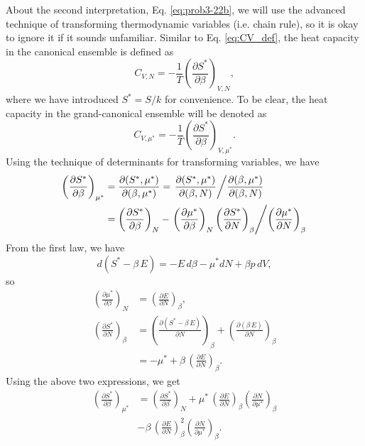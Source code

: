 \documentclass[reprint]{revtex4-1}
\numberwithin{equation}{section}
\begin{document}
About the second interpretation, Eq. \eqref{eq:prob3-22b},
we will use the advanced technique of transforming thermodynamic variables
(i.e. chain rule),
so it is okay to ignore it if it sounds unfamiliar.
%
Similar to Eq. \eqref{eq:CV_def},
the heat capacity in the canonical ensemble is defined as
\begin{equation}
C_{V, N}
= -\frac{1}{T} \left( \frac{ \partial S^* } { \partial \beta } \right)_{V, N},
  \label{eq:CVN_def}
\end{equation}
where we have introduced $S^* = S/k$ for convenience.
%
To be clear, the heat capacity in the grand-canonical ensemble
will be denoted as
\begin{equation}
C_{V, \mu^*} = -\frac{1}{T} \left( \frac{ \partial S^* } { \partial \beta } \right)_{V, \mu^*}.
  \label{eq:CVmu_def}
\end{equation}
%
Using the technique of determinants for transforming variables, we have
\begin{align*}
  \left( \frac{ \partial S^* } {\partial \beta } \right)_{\mu^*}
  &=
  \frac{ \partial (S^*, \mu^*) } { \partial (\beta, \mu^*) }
  =
  \left.
  \frac{ \partial (S^*, \mu^*) } { \partial (\beta, N) }
  \middle/
  \frac{ \partial (\beta, \mu^*) } { \partial (\beta, N) }
  \right.
  \\
  &=
  \left( \frac{ \partial S^* } {\partial \beta } \right)_{N}
  -
  \left.
  \left( \frac{ \partial \mu^* } {\partial \beta } \right)_{N}
  \left( \frac{ \partial S^* } {\partial N } \right)_{\beta}
  \middle/
  \left( \frac{ \partial \mu^* } {\partial N } \right)_{\beta}
  \right.
\end{align*}
From the first law, we have
$$
d(S^* - \beta \, E) = -E \, d\beta -\mu^* dN + \beta p \, dV
,
$$
%
so
\begin{align*}
  \left( \frac{ \partial \mu^* } {\partial \beta } \right)_{N}
  &=
  \left( \frac{ \partial E } {\partial N } \right)_{\beta}
  ,
  \\
  \left( \frac{ \partial S^* } {\partial N } \right)_{\beta}
  &=
  \left( \frac{ \partial (S^* - \beta \, E) } {\partial N } \right)_{\beta}
  +
  \left( \frac{ \partial ( \beta \,  E) } {\partial N } \right)_{\beta}
  \\
  &=
  -\mu^*
  +
  \beta \, \left( \frac{ \partial E } {\partial N } \right)_{\beta}
  .
\end{align*}
Using the above two expressions, we get
\begin{align*}
  \left( \frac{ \partial S^* } {\partial \beta } \right)_{\mu^*}
  &=
  \left( \frac{ \partial S^* } {\partial \beta } \right)_{N}
  +
  \mu^* \,
  \left( \frac{ \partial E } {\partial N } \right)_{\beta}
  \left( \frac{ \partial N } {\partial \mu^* } \right)_{\beta}
  \\
  &-
  \beta \,
  \left( \frac{ \partial E } {\partial N } \right)_{\beta}^2
  \left( \frac{ \partial N } {\partial \mu^* } \right)_{\beta}
  .
\end{align*}
\end{document}
